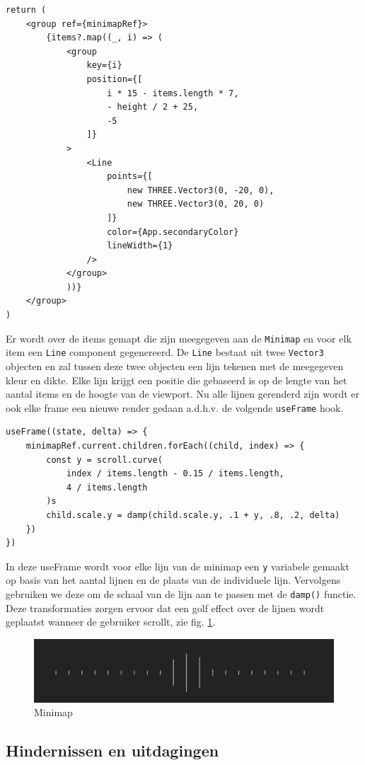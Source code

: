 \begin{lstlisting}
return (
	<group ref={minimapRef}>
		{items?.map((_, i) => (
			<group 
				key={i} 
				position={[
					i * 15 - items.length * 7,
					- height / 2 + 25,
					-5
				]}
			>
				<Line 
					points={[
						new THREE.Vector3(0, -20, 0),
						new THREE.Vector3(0, 20, 0)
					]} 
					color={App.secondaryColor} 
					lineWidth={1}
				/>
			</group>
			))}
	</group>
)
\end{lstlisting}

Er wordt over de items gemapt die zijn meegegeven aan de \texttt{Minimap} en voor elk item een \texttt{Line} component gegenereerd. De \texttt{Line} bestaat uit twee \texttt{Vector3} objecten en zal tussen deze twee objecten een lijn tekenen met de meegegeven kleur en dikte. Elke lijn krijgt een positie die gebaseerd is op de lengte van het aantal items en de hoogte van de viewport.
Nu alle lijnen gerenderd zijn wordt er ook elke frame een nieuwe render gedaan a.d.h.v. de volgende \texttt{useFrame} hook.

\begin{lstlisting}
useFrame((state, delta) => {
	minimapRef.current.children.forEach((child, index) => {
		const y = scroll.curve(
			index / items.length - 0.15 / items.length,
			4 / items.length
		)s
		child.scale.y = damp(child.scale.y, .1 + y, .8, .2, delta)
	})
})
\end{lstlisting}

In deze useFrame wordt voor elke lijn van de minimap een \texttt{y} variabele gemaakt op basis van het aantal lijnen en de plaats van de individuele lijn. Vervolgens gebruiken we deze om de schaal van de lijn aan te passen met de \texttt{damp()} functie. Deze transformaties zorgen ervoor dat een golf effect over de lijnen wordt geplaatst wanneer de gebruiker scrollt, zie fig. \ref{fig:minimap}.

\begin{figure}[h]
	\centering
	\includegraphics[width=1\linewidth]{graphics/minimap}
	\caption[Minimap]{Minimap}
	\label{fig:minimap}
\end{figure}

\subsection{Hindernissen en uitdagingen}

